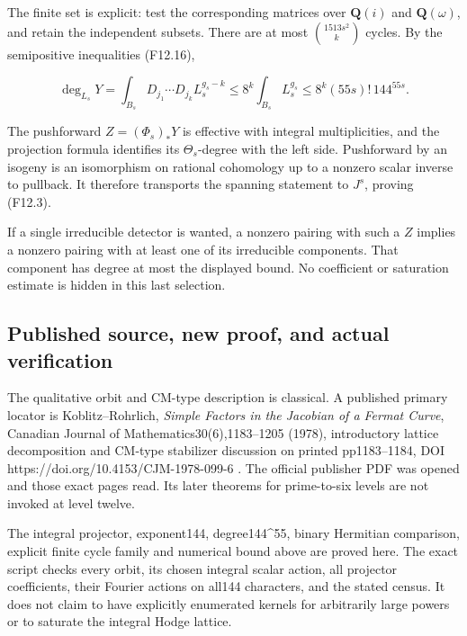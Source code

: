The finite set is explicit: test the corresponding matrices over
\(\mathbf Q(i)\) and \(\mathbf Q(\omega)\), and retain the independent
subsets. There are at most \(\binom{1513s^2}{k}\) cycles. By the
semipositive inequalities (F12.16),

\[
 \deg_{L_s}Y
 =\int_{B_s}D_{j_1}\cdots D_{j_k}L_s^{g_s-k}
 \le8^k\int_{B_s}L_s^{g_s}
 \le8^k(55s)!\,144^{55s}.
 \tag{F12.17}
\]

The pushforward \(Z=(\Phi_s)_*Y\) is effective with integral
multiplicities, and the projection formula identifies its
\(\Theta_s\)-degree with the left side. Pushforward by an isogeny is an
isomorphism on rational cohomology up to a nonzero scalar inverse to
pullback. It therefore transports the spanning statement to \(J^s\),
proving (F12.3).

If a single irreducible detector is wanted, a nonzero pairing with such
a \(Z\) implies a nonzero pairing with at least one of its irreducible
components. That component has degree at most the displayed bound. No
coefficient or saturation estimate is hidden in this last selection.

\subsection{Published source, new proof, and actual
verification}\label{published-source-new-proof-and-actual-verification}

The qualitative orbit and CM-type description is classical. A published
primary locator is Koblitz--Rohrlich, \emph{Simple Factors in the
Jacobian of a Fermat Curve}, Canadian Journal of
Mathematics30(6),1183--1205 (1978), introductory lattice decomposition
and CM-type stabilizer discussion on printed pp1183--1184, DOI
https://doi.org/10.4153/CJM-1978-099-6 . The official publisher PDF was
opened and those exact pages read. Its later theorems for prime-to-six
levels are not invoked at level twelve.

The integral projector, exponent144, degree144\^{}55, binary Hermitian
comparison, explicit finite cycle family and numerical bound above are
proved here. The exact script checks every orbit, its chosen integral
scalar action, all projector coefficients, their Fourier actions on
all144 characters, and the stated census. It does not claim to have
explicitly enumerated kernels for arbitrarily large powers or to
saturate the integral Hodge lattice.
